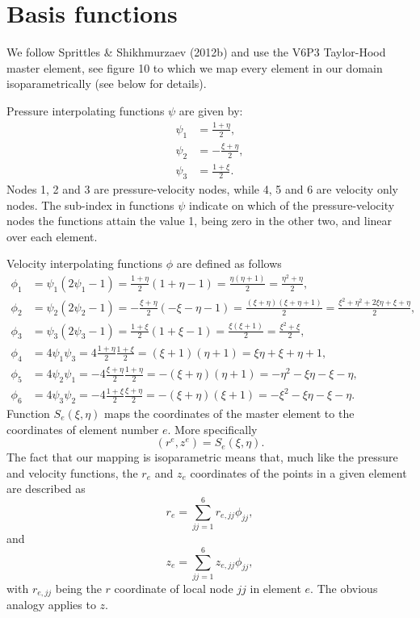 \documentclass{article}
\begin{document}
\section{Basis functions}
We follow Sprittles \& Shikhmurzaev (2012b) and use the V6P3 Taylor-Hood master element, see figure 10 to which we map every element in our domain isoparametrically (see below for details).

Pressure interpolating functions \(\psi\) are given by:
\begin{align}
\psi_{1} &= \frac{1 + \eta}{2}, \tag{19.1}\\
\psi_{2} &= -\frac{\xi + \eta}{2}, \tag{19.2}\\
\psi_{3} &= \frac{1 + \xi}{2}. \tag{19.3}
\end{align}
Nodes 1, 2 and 3 are pressure-velocity nodes, while 4, 5 and 6 are velocity only nodes. The sub-index in functions \(\psi\) indicate on which of the pressure-velocity nodes the functions attain the value 1, being zero in the other two, and linear over each element.

Velocity interpolating functions \(\phi\) are defined as follows
\begin{align}
\phi_{1} &= \psi_{1}(2\psi_{1} - 1) = \frac{1 + \eta}{2} (1 + \eta - 1) = \frac{\eta(\eta + 1)}{2} = \frac{\eta^{2} + \eta}{2}, \tag{19.4}\\
\phi_{2} &= \psi_{2}(2\psi_{2} - 1) = -\frac{\xi + \eta}{2} (-\xi -\eta - 1) = \frac{(\xi + \eta)(\xi + \eta + 1)}{2} = \frac{\xi^{2} + \eta^{2} + 2\xi\eta + \xi + \eta}{2}, \tag{19.5}\\
\phi_{3} &= \psi_{3}(2\psi_{3} - 1) = \frac{1 + \xi}{2} (1 + \xi - 1) = \frac{\xi(\xi + 1)}{2} = \frac{\xi^{2} + \xi}{2}, \tag{19.6}\\
\phi_{4} &= 4\psi_{1}\psi_{3} = 4\frac{1 + \eta}{2}\frac{1 + \xi}{2} = (\xi + 1)(\eta + 1) = \xi\eta +\xi +\eta +1, \tag{19.7}\\
\phi_{5} &= 4\psi_{2}\psi_{1} = -4\frac{\xi + \eta}{2}\frac{1 + \eta}{2} = -(\xi +\eta)(\eta + 1) = -\eta^{2} - \xi\eta -\xi -\eta , \tag{19.8}\\
\phi_{6} &= 4\psi_{3}\psi_{2} = -4\frac{1 + \xi}{2}\frac{\xi + \eta}{2} = -(\xi +\eta)(\xi + 1) = -\xi^{2} - \xi\eta -\xi -\eta . \tag{19.9}
\end{align}
Function \(S_{e}(\xi,\eta)\) maps the coordinates of the master element to the coordinates of element number \(e\). More specifically
\begin{equation}
(r^{e},z^{e}) = S_{e}(\xi,\eta). \tag{19.10}
\end{equation}
The fact that our mapping is isoparametric means that, much like the pressure and velocity functions, the \(r_e\) and \(z_e\) coordinates of the points in a given element are described as
\begin{equation}
r_e = \sum_{jj = 1}^{6} r_{e,jj} \phi_{jj}, \tag{19.11}
\end{equation}
and
\begin{equation}
z_e = \sum_{jj = 1}^{6} z_{e,jj} \phi_{jj}, \tag{19.12}
\end{equation}
with \(r_{e,jj}\) being the \(r\) coordinate of local node \(jj\) in element \(e\). The obvious analogy applies to \(z\).
\end{document}
